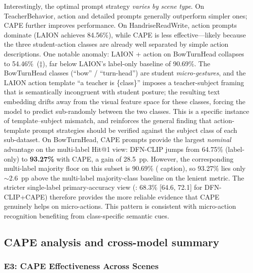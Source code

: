 \documentclass[symmetry,article,submit,pdftex,moreauthors]{Definitions/mdpi}
\begin{document}
Interestingly, the optimal prompt strategy \emph{varies by scene type}.
On TeacherBehavior, action and detailed prompts generally outperform simpler ones; CAPE further improves performance.
On HandriseReadWrite, action prompts dominate (LAION achieves 84.56\%), while CAPE is less effective---likely because the three student-action classes are already well separated by simple action descriptions.
One notable anomaly: LAION + action on BowTurnHead collapses to 54.46\%~($\ddagger$), far below LAION's label-only baseline of 90.69\%.
The BowTurnHead classes (``bow'' / ``turn-head'') are student \emph{micro-gestures}, and the LAION action template ``a teacher is \{class\}'' imposes a teacher-subject framing that is semantically incongruent with student posture; the resulting text embedding drifts away from the visual feature space for these classes, forcing the model to predict sub-randomly between the two classes.
This is a specific instance of template--subject mismatch, and reinforces the general finding that action-template prompt strategies should be verified against the subject class of each sub-dataset.
On BowTurnHead, CAPE prompts provide the largest \emph{nominal} advantage on the multi-label Hit@1 view: DFN-CLIP jumps from 64.75\% (label-only) to \textbf{93.27\%} with CAPE, a gain of 28.5~pp. However, the corresponding multi-label majority floor on this subset is 90.69\% ( caption), so 93.27\% lies only $\sim$2.6~pp above the multi-label majority-class baseline on the lenient metric. The stricter single-label primary-accuracy view (: 68.3\% [64.6, 72.1] for DFN-CLIP+CAPE) therefore provides the more reliable evidence that CAPE genuinely helps on micro-actions.
This pattern is consistent with micro-action recognition benefiting from class-specific semantic cues.

\subsection{CAPE analysis and cross-model summary}

\subsubsection{E3: CAPE Effectiveness Across Scenes}
\label{sec:e3}
\end{document}
